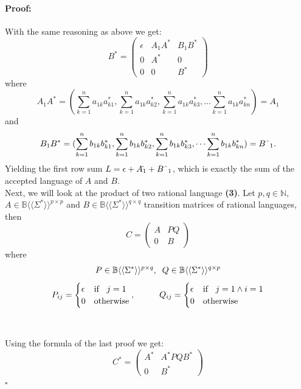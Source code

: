 \documentclass[12pt,letterpaper]{article}
\newenvironment{proof}{\paragraph{Proof:}}{\hfill$\square$}
\newcommand{\fps}[1] {
\mathbb{#1}\langle \langle \Sigma^* \rangle \rangle
}
\begin{document}
\begin{proof}
\begin{center}
\begin{tikzpicture}[shorten >=1pt,node distance=2cm,on grid,auto]
    \end{tikzpicture}
  \end{center}
  With the same reasoning as above we get:
  \[
    B^* = 
    \begin{pmatrix}
      \epsilon & A_1A^* & B_1B^*\\
      0        & A^*    & 0 \\
      0        & 0      & B^*
    \end{pmatrix}
  \]
  where 
  \[
    A_1A^* = (\sum_{k=1}^{n}a_{1k}a^*_{k1}, \sum_{k=1}^{n}a_{1k}a^*_{k2},
        \sum_{k=1}^{n}a_{1k}a^*_{k3}, \dots \sum_{k=1}^{n}a_{1k}a^*_{kn})
        = A\hat{}_1
  \]
  and 
  \[
    B_1B^* = (\sum_{k=1}^{n}b_{1k}b^*_{k1}, \sum_{k=1}^{n}b_{1k}b^*_{k2},
        \sum_{k=1}^{n}b_{1k}b^*_{k3}, \dots \sum_{k=1}^{n}b_{1k}b^*_{kn})
        = B{\mathchar"5E}_1.
  \]
  Yielding the first row sum $L = \epsilon + A\hat{}_1 + B{\mathchar"5E}_1$,
  which is exactly the sum of the accepted language of $A$ and $B$.\\
  Next, we will look at the product of two rational language {\bf (3)}.
  Let $p,q\in \mathbb{N}$, $A \in \fps{B}^{p \times p}$ and $B \in \fps{B}^{q \times q}$ transition matrices of rational
  languages, then
  \[
    C = 
    \begin{pmatrix}
      A & PQ \\
      0 & B
    \end{pmatrix}
  \]
  where
  \[ P \in \fps{B}^{p \times q}, \hspace{0.2cm}Q \in \fps{B}^{q \times p}\]
  \[
    P_{ij} = 
    \begin{cases}
      \epsilon & \text{if } \hspace{0.2cm} j = 1\\
      0        & \text{otherwise}
    \end{cases}
    , \hspace{1cm}
    Q_{ij} = 
    \begin{cases}
      \epsilon & \text{if } \hspace{0.2cm} j = 1 \land i = 1\\
      0        & \text{otherwise}
    \end{cases}
  \]
  \\
  \pagebreak
  \\
  Using the formula of the last proof we get:
  \[
    C^* = 
    \begin{pmatrix}
      A^* & A^*PQB^* \\
      0 & B^*
    \end{pmatrix}
\]
\end{proof}
\end{document}
